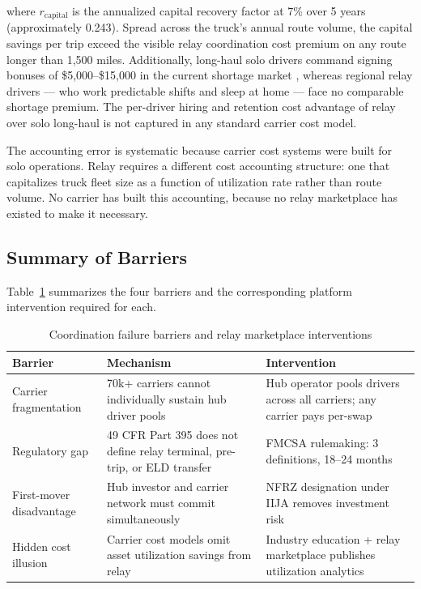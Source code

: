 where $r_{\text{capital}}$ is the annualized capital recovery factor at 7\% over 5 years (approximately 0.243). Spread across the truck's annual route volume, the capital savings per trip exceed the visible relay coordination cost premium on any route longer than 1,500 miles. Additionally, long-haul solo drivers command signing bonuses of \$5,000--\$15,000 in the current shortage market \citep{ATRI_shortage2024}, whereas regional relay drivers --- who work predictable shifts and sleep at home --- face no comparable shortage premium. The per-driver hiring and retention cost advantage of relay over solo long-haul is not captured in any standard carrier cost model.

The accounting error is systematic because carrier cost systems were built for solo operations. Relay requires a different cost accounting structure: one that capitalizes truck fleet size as a function of utilization rate rather than route volume. No carrier has built this accounting, because no relay marketplace has existed to make it necessary.

\subsection{Summary of Barriers}

Table~\ref{tab:barriers} summarizes the four barriers and the corresponding platform intervention required for each.

\begin{table}[ht]
\centering
\caption{Coordination failure barriers and relay marketplace interventions}
\label{tab:barriers}
\begin{tabular}{p{3cm}p{5cm}p{5cm}}
\toprule
\textbf{Barrier} & \textbf{Mechanism} & \textbf{Intervention} \\
\midrule
Carrier fragmentation & 70k+ carriers cannot individually sustain hub driver pools & Hub operator pools drivers across all carriers; any carrier pays per-swap \\
Regulatory gap & 49 CFR Part 395 does not define relay terminal, pre-trip, or ELD transfer & FMCSA rulemaking: 3 definitions, 18--24 months \\
First-mover disadvantage & Hub investor and carrier network must commit simultaneously & NFRZ designation under IIJA removes investment risk \\
Hidden cost illusion & Carrier cost models omit asset utilization savings from relay & Industry education + relay marketplace publishes utilization analytics \\
\bottomrule
\end{tabular}
\end{table}
